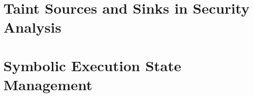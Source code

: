\section{Taint Sources and Sinks in Security Analysis}

\section{Symbolic Execution State Management}
